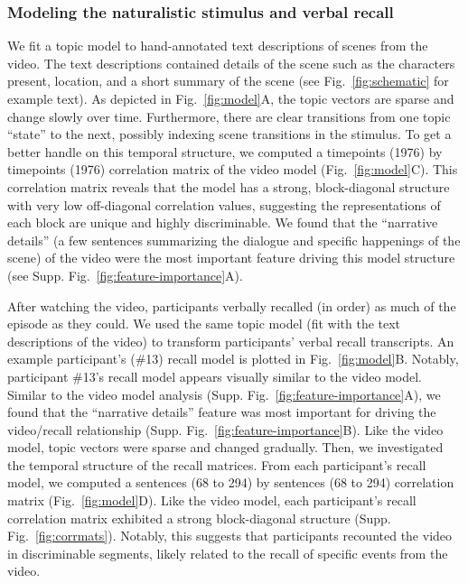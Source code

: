 \documentclass{article}
\begin{document}
\subsubsection*{Modeling the naturalistic stimulus and verbal recall}
We fit a topic model \citep{BleiEtal03} to hand-annotated text descriptions of scenes from the video. The text descriptions contained details of the scene such as the characters present, location, and a short summary of the scene (see Fig.~\ref{fig:schematic} for example text). As depicted in Fig.~\ref{fig:model}A, the topic vectors are sparse and change slowly over time. Furthermore, there are clear transitions from one topic ``state'' to the next, possibly indexing scene transitions in the stimulus. To get a better handle on this temporal structure, we computed a timepoints (1976) by timepoints (1976) correlation matrix of the video model (Fig.~\ref{fig:model}C).  This correlation matrix reveals that the model has a strong, block-diagonal structure with very low off-diagonal correlation values, suggesting the representations of each block are unique and highly discriminable. We found that the ``narrative details'' (a few sentences summarizing the dialogue and specific happenings of the scene) of the video were the most important feature driving this model structure (see Supp. Fig.~\ref{fig:feature-importance}A).

After watching the video, participants verbally recalled (in order) as much of the episode as they could.  We used the same topic model (fit with the text descriptions of the video) to transform participants' verbal recall transcripts. An example participant's (\#13) recall model is plotted in Fig.~\ref{fig:model}B. Notably, participant \#13's recall model appears visually similar to the video model. Similar to the video model analysis (Supp. Fig.~\ref{fig:feature-importance}A), we found that the ``narrative details'' feature was most important for driving the video/recall relationship (Supp. Fig.~\ref{fig:feature-importance}B).  Like the video model, topic vectors were sparse and changed gradually.  Then, we investigated the temporal structure of the recall matrices. From each participant's recall model, we computed a sentences (68 to 294) by sentences (68 to 294) correlation matrix (Fig.~\ref{fig:model}D). Like the video model, each participant's recall correlation matrix exhibited a strong block-diagonal structure (Supp. Fig.~\ref{fig:corrmats}). Notably, this suggests that participants recounted the video in discriminable segments, likely related to the recall of specific events from the video.
\end{document}

